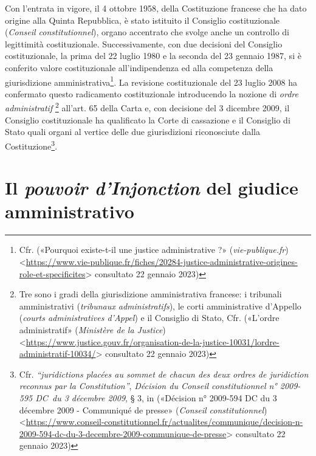 \documentclass[12pt,it,a4paper,]{report}
\begin{document}
Con l'entrata in vigore, il 4 ottobre 1958, della Costituzione francese
che ha dato origine alla Quinta Repubblica, è stato istituito il
Consiglio costituzionale (\emph{Conseil constitutionnel}), organo
accentrato che svolge anche un controllo di legittimità costituzionale.
Successivamente, con due decisioni del Consiglio costituzionale, la
prima del 22 luglio 1980 e la seconda del 23 gennaio 1987, si è
conferito valore costituzionale all'indipendenza ed alla competenza
della giurisdizione amministrativa\footnote{Cfr. ({«Pourquoi existe-t-il
  une justice administrative ?»} (\emph{vie-publique.fr})
  \textless{}\url{https://www.vie-publique.fr/fiches/20284-justice-administrative-origines-role-et-specificites}\textgreater{}
  consultato 22 gennaio 2023)}. La revisione costituzionale del 23
luglio 2008 ha confermato questo radicamento costituzionale introducendo
la nozione di \emph{ordre administratif} \footnote{Tre sono i gradi
  della giurisdizione amministrativa francese: i tribunali
  amministrativi (\emph{tribunaux administratifs}), le corti
  amministrative d'Appello (\emph{courts administratives d'Appel}) e il
  Consiglio di Stato, Cfr. ({«L'ordre administratif»} (\emph{Ministère
  de la Justice})
  \textless{}\url{https://www.justice.gouv.fr/organisation-de-la-justice-10031/lordre-administratif-10034/}\textgreater{}
  consultato 22 gennaio 2023)} all'art. 65 della Carta e, con decisione
del 3 dicembre 2009, il Consiglio costituzionale ha qualificato la Corte
di cassazione e il Consiglio di Stato quali organi al vertice delle due
giurisdizioni riconosciute dalla Costituzione\footnote{Cfr.
  \emph{``juridictions placées au sommet de chacun des deux ordres de
  juridiction reconnus par la Constitution''}, \emph{Décision du Conseil
  constitutionnel n° 2009-595 DC~du 3 décembre 2009}, § 3, in
  ({«Décision n° 2009-594 DC du 3 décembre 2009 - Communiqué de presse»}
  (\emph{Conseil constitutionnel})
  \textless{}\url{https://www.conseil-constitutionnel.fr/actualites/communique/decision-n-2009-594-dc-du-3-decembre-2009-communique-de-presse}\textgreater{}
  consultato 22 gennaio 2023)}.

\hypertarget{il-pouvoir-dinjonction-del-giudice-amministrativo}{%
\section{\texorpdfstring{Il \emph{pouvoir d'Injonction} del giudice
amministrativo}{Il pouvoir d'Injonction del giudice amministrativo}}\label{il-pouvoir-dinjonction-del-giudice-amministrativo}}
\end{document}
